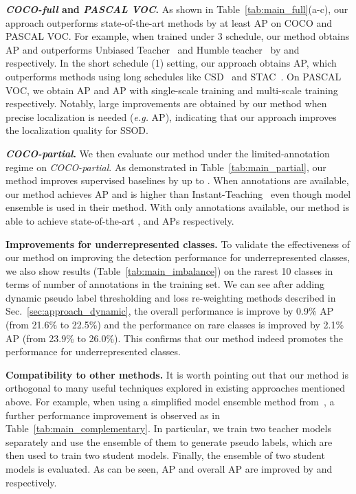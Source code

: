 \documentclass[letterpaper]{article} \usepackage{aaai22}  \usepackage{times}  \usepackage{helvet}  \usepackage{courier}  \usepackage[hyphens]{url}  \usepackage{graphicx} \urlstyle{rm} \def\UrlFont{\rm}  \usepackage{natbib}  \usepackage{caption} \DeclareCaptionStyle{ruled}{labelfont=normalfont,labelsep=colon,strut=off} \frenchspacing  \setlength{\pdfpagewidth}{8.5in}  \setlength{\pdfpageheight}{11in}  \usepackage{algorithm}
\makeatletter
\newcommand*{\eg}{\emph{e.g.}\@\xspace}
\makeatother
\begin{document}
\noindent\textbf{\emph{COCO-full} and \emph{PASCAL VOC}.} As shown in Table~\ref{tab:main_full}(a-c), our approach outperforms state-of-the-art methods by at least  AP on COCO and PASCAL VOC. For example, when trained under 3 schedule, our method obtains  AP and outperforms Unbiased Teacher~\citeyearpar{unbiasedteacher} and Humble teacher~\citeyearpar{tang2021humble} by  and  respectively. In the short schedule (1) setting, our approach obtains  AP, which outperforms methods using long schedules like CSD~\citeyearpar{csd} and STAC~\citeyearpar{stac}. On PASCAL VOC, we obtain  AP and  AP with single-scale training and multi-scale training respectively. Notably, large improvements are obtained by our method when precise localization is needed (\eg AP), indicating that our approach improves the localization quality for SSOD. 

\noindent\textbf{\emph{COCO-partial}.} We then evaluate our method under the limited-annotation regime on \emph{COCO-partial}. As demonstrated in Table~\ref{tab:main_partial},  our method improves supervised baselines by up to . When  annotations are available, our method achieves  AP and is  higher than Instant-Teaching~\cite{instantteaching} even though model ensemble is used in their method. With only  annotations available, our method is able to achieve state-of-the-art ,  and  APs respectively.

\noindent\textbf{Improvements for underrepresented classes.} To validate the effectiveness of our method on improving the detection performance for underrepresented classes, we also show results (Table~\ref{tab:main_imbalance}) on the rarest 10 classes in terms of number of annotations in the training set. We can see after adding dynamic pseudo label thresholding and loss re-weighting methods described in Sec.~\ref{sec:approach_dynamic}, the overall performance is improve by 0.9\% AP (from 21.6\% to 22.5\%) and the performance on rare classes is improved by 2.1\% AP (from 23.9\% to 26.0\%). This confirms that our method indeed promotes the performance for underrepresented classes. 

\noindent\textbf{Compatibility to other methods.} It is worth pointing out that our method is orthogonal to many useful techniques explored in existing approaches mentioned above. For example, when using a simplified model ensemble method from~\cite{instantteaching}, a further performance improvement is observed as in Table~\ref{tab:main_complementary}. In particular, we train two teacher models separately and use the ensemble of them to generate pseudo labels, which are then used to train two student models. Finally, the ensemble of two student models is evaluated. As can be seen, AP and overall AP are improved by  and  respectively. 
\end{document}
